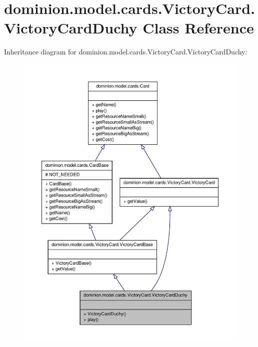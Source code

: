 \hypertarget{classdominion_1_1model_1_1cards_1_1VictoryCard_1_1VictoryCardDuchy}{\section{dominion.\-model.\-cards.\-Victory\-Card.\-Victory\-Card\-Duchy \-Class \-Reference}
\label{classdominion_1_1model_1_1cards_1_1VictoryCard_1_1VictoryCardDuchy}
}


\-Inheritance diagram for dominion.\-model.\-cards.\-Victory\-Card.\-Victory\-Card\-Duchy\-:
\nopagebreak
\begin{figure}[H]
\begin{center}
\leavevmode
\includegraphics[width=350pt]{classdominion_1_1model_1_1cards_1_1VictoryCard_1_1VictoryCardDuchy__inherit__graph}
\end{center}
\end{figure}


